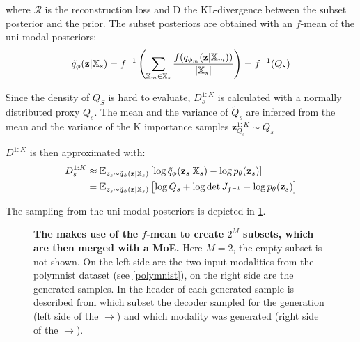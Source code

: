where $\mathcal{R}$ is the reconstruction loss and D the KL-divergence between the subset posterior and the prior.
The subset posteriors are obtained with an $f$-mean of the uni modal posteriors:
\begin{equation}
    \tilde{q}_{\phi}(\textbf{z}|\mathbb{X}_s) = f^{-1}\left(\sum _{\mathbb{X}_m \in \mathbb{X}_s} \frac{f(q_{\phi_m}(\textbf{z}|\mathbb{X}_m))}{|\mathbb{X}_s|}\right) = f^{-1}(Q_s)
\end{equation}

Since the density of $Q_S$ is hard to evaluate, $D^{1:K}_s$ is calculated with a normally distributed proxy $\tilde{Q}_s$.
The mean and the variance of $\tilde{Q}_s$ are inferred from the mean and the variance of the K importance samples $\textbf{z}_{Q_s}^{1:K} \sim Q_s$

$D^{1:K}$ is then approximated with:
\begin{equation}
    \begin{split}
        D^{1:K}_s &\approx \mathbb{E}_{z_s \sim \tilde{q}_{\phi}(\textbf{z}|\mathbb{X}_s)} \left[ \log \tilde{q}_{\phi}(\textbf{z} _s|\mathbb{X}_s) - \log p_{\theta}(\textbf{z} _s) \right]\\
        &=\mathbb{E}_{z_s \sim \tilde{q}_{\phi}(\textbf{z}|\mathbb{X}_s)} \left[ \log Q_s + \log \det J_{f^{-1}} - \log p_{\theta}(\textbf{z} _s) \right]\\
    \end{split}
\end{equation}

The sampling from the uni modal posteriors is depicted in \cref{iwmogfmGraph}.


\begin{figure}[h!]
    \centering
    \caption{\textbf{The  makes use of the $f$-mean to create $2^M$ subsets, which are then merged with a MoE.} Here $M=2$, the empty subset is not shown. On the left side are the two input modalities from the polymnist dataset (see \cref{polymnist}), on the right side are the generated samples. In the header of each generated sample is described from which subset the decoder sampled for the generation (left side of the $\rightarrow$) and which modality was generated (right side of the $\rightarrow$).}
    \label{iwmogfmGraph}
\end{figure}



